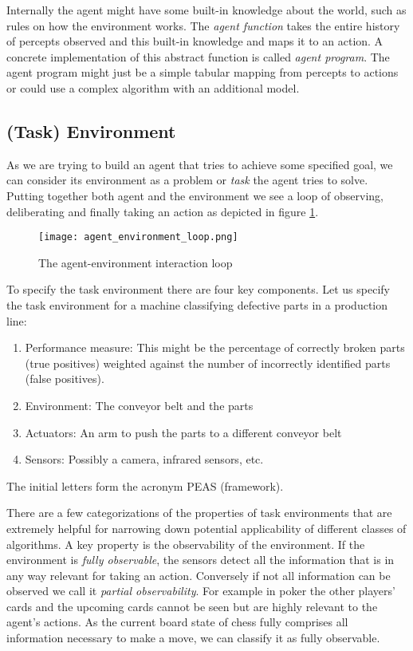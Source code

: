 Internally the agent might have some built-in knowledge about the world, such as rules on how the environment works. The \textit{agent function} takes the entire history of percepts observed and this built-in knowledge and maps it to an action. A concrete implementation of this abstract function is called \textit{agent program}. The agent program might just be a simple tabular mapping from percepts to actions or could use a complex algorithm with an additional model.

\subsection{(Task) Environment}
\label{environment}

As we are trying to build an agent that tries to achieve some specified goal, we can consider its environment as a problem or \textit{task} the agent tries to solve. Putting together both agent and the environment we see a loop of observing,  deliberating and finally taking an action as depicted in figure \ref{agent_environment_loop}.

\begin{figure}
    \centering
    \texttt{[image: agent\_environment\_loop.png]}
    \caption{The agent-environment interaction loop \cite[cf. p. 96]{russell_artificial_2021}}
    \label{agent_environment_loop}
\end{figure}

To specify the task environment there are four key components. Let us specify the task environment for a machine classifying defective parts in a production line:

\begin{enumerate}
    \item Performance measure: This might be the percentage of correctly broken parts (true positives) weighted against the number of incorrectly identified parts (false positives).
    \item Environment: The conveyor belt and the parts
    \item Actuators: An arm to push the parts to a different conveyor belt
    \item Sensors: Possibly a camera, infrared sensors, etc.
\end{enumerate}

The initial letters form the acronym PEAS (framework).

There are a few categorizations of the properties of task environments that are extremely helpful for narrowing down potential applicability of different classes of algorithms. A key property is the observability of the environment. If the environment is \textit{fully observable}, the sensors detect all the information that is in any way relevant for taking an action. Conversely if not all information can be observed we call it \textit{partial observability}. For example in poker the other players' cards and the upcoming cards cannot be seen but are highly relevant to the agent's actions. As the current board state of chess fully comprises all information necessary to make a move, we can classify it as fully observable.

